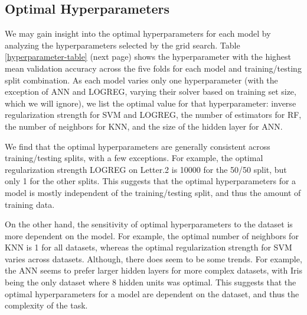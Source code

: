 \documentclass{article}
\begin{document}
\subsection{Optimal Hyperparameters}
We may gain insight into the optimal hyperparameters for each model by
analyzing the hyperparameters selected by the grid search. Table
\ref{hyperparameter-table} (next page) shows the hyperparameter with the
highest mean validation accuracy across the five folds for each model and
training/testing split combination. As each model varies only one
hyperparameter (with the exception of ANN and LOGREG, varying their solver
based on training set size, which we will ignore), we list the optimal value
for that hyperparameter: inverse regularization strength for SVM and LOGREG,
the number of estimators for RF, the number of neighbors for KNN, and the size
of the hidden layer for ANN.

We find that the optimal hyperparameters are generally consistent across
training/testing splits, with a few exceptions. For example, the optimal
regularization strength LOGREG on Letter.2 is 10000 for the 50/50 split, but
only 1 for the other splits. This suggests that the optimal hyperparameters for
a model is mostly independent of the training/testing split, and thus the
amount of training data.

On the other hand, the sensitivity of optimal hyperparameters to the dataset is
more dependent on the model. For example, the optimal number of neighbors for
KNN is 1 for all datasets, whereas the optimal regularization strength for SVM
varies across datasets. Although, there does seem to be some trends. For
example, the ANN seems to prefer larger hidden layers for more complex
datasets, with Iris being the only dataset where 8 hidden units was optimal.
This suggests that the optimal hyperparameters for a model are dependent on the
dataset, and thus the complexity of the task.
\end{document}
